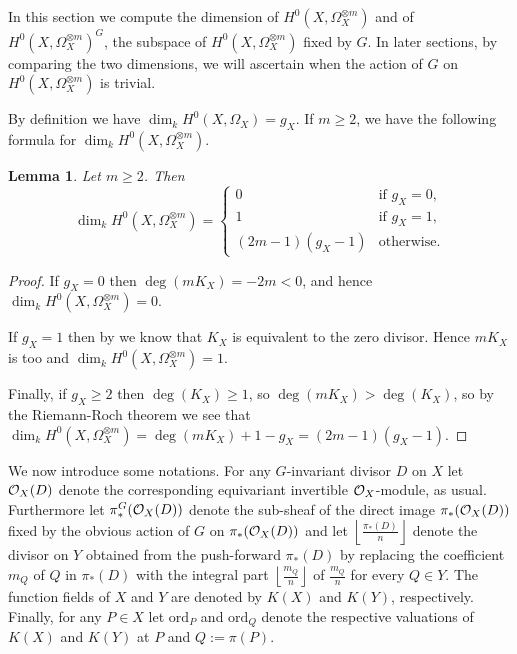 \documentclass[11pt]{article} %
\newtheorem{lem}{Lemma}
\theoremstyle{remark}\newtheorem*{rem}{Remark}
\newcommand{\cO}{{\cal O}}
\begin{document}
In this section we compute the dimension of $H^0(X,\Omega_X^{\otimes m})$ and of $H^0(X,\Omega_X^{\otimes m})^G$, the subspace of $H^0(X,\Omega_X^{\otimes m})$ fixed by $G$.
In later sections, by comparing the two dimensions, we will ascertain when the action of $G$ on $H^0(X,\Omega_X^{\otimes m})$ is trivial.

By definition we have $\dim_kH^0(X,\Omega_X)=g_X$.
If $m\geq 2$, we have the following formula for $\dim_kH^0(X,\Omega_X^{\otimes m})$.\\


\begin{lem}\label{dim3}
  Let $m\geq 2$. Then
    \begin{equation}
      \dim_kH^0(X,\Omega_X^{\otimes m}) =
	\begin{cases}
	  0 & \mbox{if } g_X=0,\\
	  1 & \mbox{if } g_X=1,\\
	  (2m-1)(g_X-1) & \mbox{otherwise}.
	\end{cases}
    \end{equation}
\end{lem}
\begin{proof}
  If $g_X=0$ then $\deg(mK_X)=-2m<0$, and hence $\dim_kH^0(X,\Omega_X^{\otimes m})=0$.

  If $g_X=1$ then by \cite[Ch. IV, Example 1.3.6]{hart} we know that $K_X$ is equivalent to the zero divisor.
  Hence $mK_X$ is too and $\dim_kH^0(X,\Omega_X^{\otimes m})=1$.

  Finally, if $g_X\geq 2$ then $\deg(K_X)\geq1$, so $\deg(mK_X)>\deg(K_X)$, so by the Riemann-Roch theorem \cite[Ch. 8, {\S}6]{fulton} we see that $\dim_kH^0(X,\Omega_X^{\otimes m})=\deg(mK_X)+1-g_X=(2m-1)(g_X-1)$.
\end{proof}

We now introduce some notations. 
For any $G$-invariant divisor $D$ on $X$ let $\cO_X(D)$ denote the corresponding equivariant invertible $\cO_X$-module, as usual. 
Furthermore let $\pi_*^G(\cO_X(D))$ denote the sub-sheaf of the direct image $\pi_*(\cO_X(D))$ fixed by the obvious action of $G$ on $\pi_*(\cO_X(D))$ and let $\left\lfloor \frac{\pi_*(D)}{n}
\right \rfloor$ denote the divisor on $Y$ obtained from the push-forward $\pi_*(D)$ by replacing the coefficient $m_Q$ of $Q$ in $\pi_*(D)$ with the integral part $\left \lfloor \frac{m_Q}{n} \right \rfloor$ of $\frac{m_Q}{n}$ for every $Q \in Y$. 
The function fields of $X$ and $Y$ are denoted by $K(X)$ and $K(Y)$, respectively. 
Finally, for any $P \in X$ let $\textrm{ord}_P$ and $\textrm{ord}_Q$ denote the respective valuations of $K(X)$ and $K(Y)$ at $P$ and $Q:=\pi(P)$.
\end{document}
